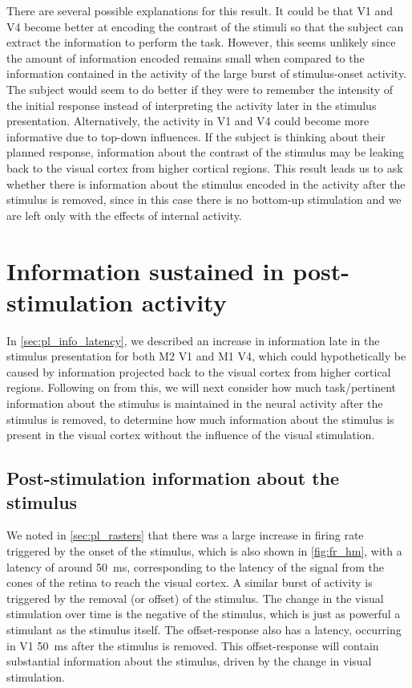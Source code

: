There are several possible explanations for this result.
It could be that \ac{V1} and \ac{V4} become better at encoding the contrast of the stimuli so that the subject can extract the information to perform the task.
However, this seems unlikely since the amount of information encoded remains small when compared to the information contained in the activity of the large burst of stimulus-onset activity.
The subject would seem to do better if they were to remember the intensity of the initial response instead of interpreting the activity later in the stimulus presentation.
Alternatively, the activity in \ac{V1} and \ac{V4} could become more informative due to top-down influences.
If the subject is thinking about their planned response, information about the contrast of the stimulus may be leaking back to the visual cortex from higher cortical regions.
This result leads us to ask whether there is information about the stimulus encoded in the activity after the stimulus is removed, since in this case there is no bottom-up stimulation and we are left only with the effects of internal activity.


\section{Information sustained in post-stimulation activity}
\label{sec:pl_poststim_info}

In \autoref{sec:pl_info_latency}, we described an increase in information late in the stimulus presentation for both \ac{M2} \ac{V1} and \ac{M1} \ac{V4}, which could hypothetically be caused by information projected back to the visual cortex from higher cortical regions.
Following on from this, we will next consider how much task\-/pertinent information about the stimulus is maintained in the neural activity after the stimulus is removed, to determine how much information about the stimulus is present in the visual cortex without the influence of the visual stimulation.


\subsection{Post-stimulation information about the stimulus}

We noted in \autoref{sec:pl_rasters} that there was a large increase in firing rate triggered by the onset of the stimulus, which is also shown in \autoref{fig:fr_hm}, with a latency of around \SI{50}{\milli\second}, corresponding to the latency of the signal from the cones of the retina to reach the visual cortex.
A similar burst of activity is triggered by the removal (or offset) of the stimulus.
The change in the visual stimulation over time is the negative of the stimulus, which is just as powerful a stimulant as the stimulus itself.
The offset-response also has a latency, occurring in \ac{V1} \SI{50}{\milli\second} after the stimulus is removed.
This offset-response will contain substantial information about the stimulus, driven by the change in visual stimulation.

